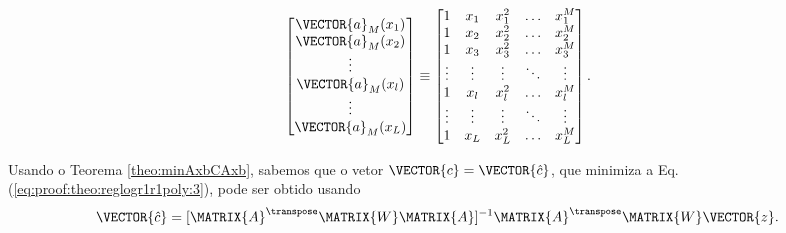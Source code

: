 \begin{myproofT}
\begin{equation}
\begin{bmatrix}
\VECTOR{a}_M(x_1)\\
\VECTOR{a}_M(x_2)\\
\vdots\\
\VECTOR{a}_M(x_l)\\
\vdots\\
\VECTOR{a}_M(x_L)\\
\end{bmatrix}
\equiv 
\begin{bmatrix}
1      & x_1    & x_1^2  & \hdots  & x_1^M  \\
1      & x_2    & x_2^2  & \hdots  & x_2^M  \\
1      & x_3    & x_3^2  & \hdots  & x_3^M  \\
\vdots & \vdots & \vdots & \ddots  & \vdots \\
1      & x_l    & x_l^2  & \hdots  & x_l^M  \\
\vdots & \vdots & \vdots & \ddots  & \vdots \\
1      & x_L    & x_L^2  & \hdots  & x_L^M  \\ 
\end{bmatrix}.
\end{equation}


Usando o Teorema \ref{theo:minAxbCAxb}, sabemos que o vetor $\VECTOR{c}=\VECTOR{\hat{c}}$,
que minimiza a Eq. (\ref{eq:proof:theo:reglogr1r1poly:3}), pode ser obtido usando 
\begin{equation}\label{eq:proof:theo:reglogr1r1poly:5}
\VECTOR{\hat{c}}=[\MATRIX{A}^{\transpose}\MATRIX{W}\MATRIX{A}]^{-1}\MATRIX{A}^{\transpose}\MATRIX{W}\VECTOR{z}.
\end{equation}
\end{myproofT}


